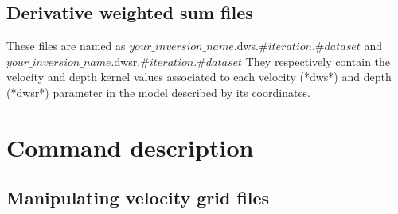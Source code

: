\documentclass[twoside,final,onecolumn]{article}
\begin{document}
\subsection{Derivative weighted sum files}

These files are named as $your\_inversion\_name$.dws.$\#iteration$.$\#dataset$ and $your\_inversion\_name$.dwsr.$\#iteration$.$\#dataset$
They respectively contain the velocity and depth kernel values associated to each velocity (*dws*) and depth (*dwsr*) parameter 
in the model described by its coordinates.

\section{Command description} \label {command}

\subsection{Manipulating velocity grid files}
\end{document}
